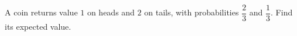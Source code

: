 A coin returns value $1$ on heads and $2$ on tails, with probabilities $\dfrac{2}{3}$ and $\dfrac{1}{3}$. Find its expected value.
